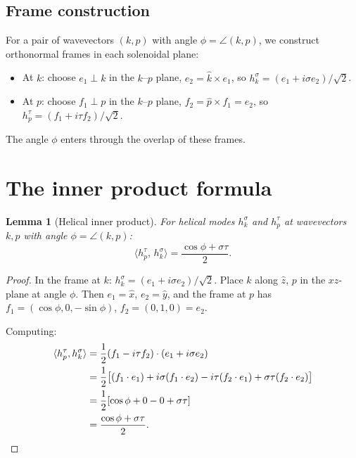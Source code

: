 \documentclass[11pt]{article}
\newtheorem{lemma}[theorem]{Lemma}
\theoremstyle{definition}
\theoremstyle{remark}
\begin{document}
\subsection{Frame construction}

For a pair of wavevectors $(k, p)$ with angle $\phi = \angle(k, p)$,
we construct orthonormal frames in each solenoidal plane:
\begin{itemize}
  \item At $k$: choose $e_1 \perp k$ in the $k$--$p$ plane,
    $e_2 = \hat{k} \times e_1$, so
    $h_k^\sigma = (e_1 + i\sigma e_2)/\sqrt{2}$.
  \item At $p$: choose $f_1 \perp p$ in the $k$--$p$ plane,
    $f_2 = \hat{p} \times f_1 = e_2$, so
    $h_p^\tau = (f_1 + i\tau f_2)/\sqrt{2}$.
\end{itemize}
The angle $\phi$ enters through the overlap of these frames.

\section{The inner product formula}

\begin{lemma}[Helical inner product]\label{lem:inner}
For helical modes $h_k^\sigma$ and $h_p^\tau$ at wavevectors $k, p$
with angle $\phi = \angle(k, p)$:
\[
  \langle h_p^\tau,\, h_k^\sigma \rangle = \frac{\cos\phi + \sigma\tau}{2}.
\]
\end{lemma}

\begin{proof}
In the frame at $k$: $h_k^\sigma = (e_1 + i\sigma e_2)/\sqrt{2}$.
Place $k$ along $\hat{z}$, $p$ in the $xz$-plane at angle $\phi$.
Then $e_1 = \hat{x}$, $e_2 = \hat{y}$, and the frame at $p$ has
$f_1 = (\cos\phi, 0, -\sin\phi)$, $f_2 = (0, 1, 0) = e_2$.

Computing:
\begin{align*}
  \langle h_p^\tau, h_k^\sigma \rangle
  &= \frac{1}{2}(f_1 - i\tau f_2) \cdot (e_1 + i\sigma e_2) \\
  &= \frac{1}{2}\bigl[(f_1 \cdot e_1) + i\sigma(f_1 \cdot e_2)
    - i\tau(f_2 \cdot e_1) + \sigma\tau(f_2 \cdot e_2)\bigr] \\
  &= \frac{1}{2}[\cos\phi + 0 - 0 + \sigma\tau] \\
  &= \frac{\cos\phi + \sigma\tau}{2}. \qedhere
\end{align*}
\end{proof}
\end{document}
